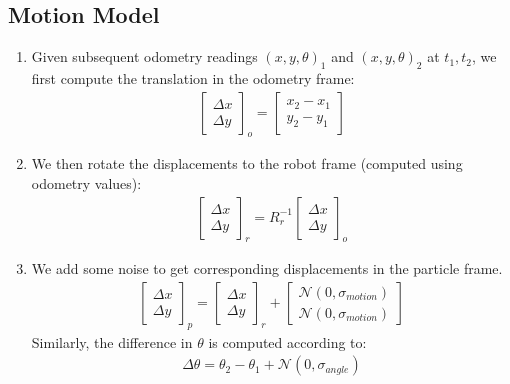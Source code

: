 \documentclass[11pt]{article}
\begin{document}
\subsection{Motion Model}
\begin{enumerate}
\item Given subsequent odometry readings $\left(x,y,\theta\right)_{1}$ and $\left(x,y,\theta\right)_{2}$ at $t_{1}, t_{2}$, we first compute the translation in the odometry frame:
\begin{align*}
\begin{bmatrix}
\Delta x \\
\Delta y
\end{bmatrix}_{o} = 
\begin{bmatrix}
x_{2} - x_{1} \\
y_{2} - y_{1}
\end{bmatrix}
\end{align*} 

\item We then rotate the displacements to the robot frame (computed using odometry values):
\begin{align*}
\begin{bmatrix}
\Delta x \\
\Delta y
\end{bmatrix}_{r} = 
R_{r}^{-1}
\begin{bmatrix}
\Delta x \\
\Delta y
\end{bmatrix}_{o} 
\end{align*}

\item We add some noise to get corresponding displacements in the particle frame.
\begin{align*}
\begin{bmatrix}
\Delta x \\
\Delta y
\end{bmatrix}_{p} = 
\begin{bmatrix}
\Delta x \\
\Delta y
\end{bmatrix}_{r} +
\begin{bmatrix}
\mathcal{N}\left( 0, \sigma_{motion} \right) \\
\mathcal{N}\left( 0, \sigma_{motion} \right)
\end{bmatrix}_{}
\end{align*}
Similarly, the difference in $\theta$ is computed according to:
\begin{align*}
\Delta \theta = \theta_{2} - \theta_{1} + \mathcal{N}\left( 0, \sigma_{angle} \right)
\end{align*}


\end{enumerate}
\end{document}
